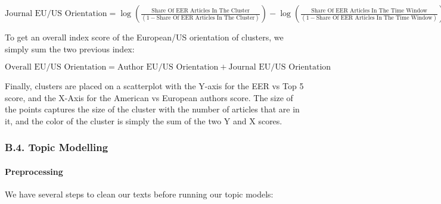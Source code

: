 \documentclass[]{elsarticle} %
\begin{document}
\({\scriptstyle \text{Journal EU/US Orientation}=\log(\frac{\text{Share Of EER Articles In The Cluster}}{(1-\text{Share Of EER Articles In The Cluster})})-\log(\frac{\text{Share Of EER Articles In The Time Window}}{(1-\text{Share Of EER Articles In The Time Window})})}\)

To get an overall index score of the European/US orientation of
clusters, we simply sum the two previous index:

\({\scriptstyle \text{Overall EU/US Orientation}=\text{Author EU/US Orientation} + \text{Journal EU/US Orientation}}\)

Finally, clusters are placed on a scatterplot with the Y-axis for the
EER vs Top 5 score, and the X-Axis for the American vs European authors
score. The size of the points captures the size of the cluster with the
number of articles that are in it, and the color of the cluster is
simply the sum of the two Y and X scores.

\hypertarget{topic}{%
\subsubsection*{B.4. Topic Modelling}\label{topic}}

\hypertarget{preprocessing}{%
\paragraph*{Preprocessing}\label{preprocessing}}

We have several steps to clean our texts before running our topic
models:
\end{document}
